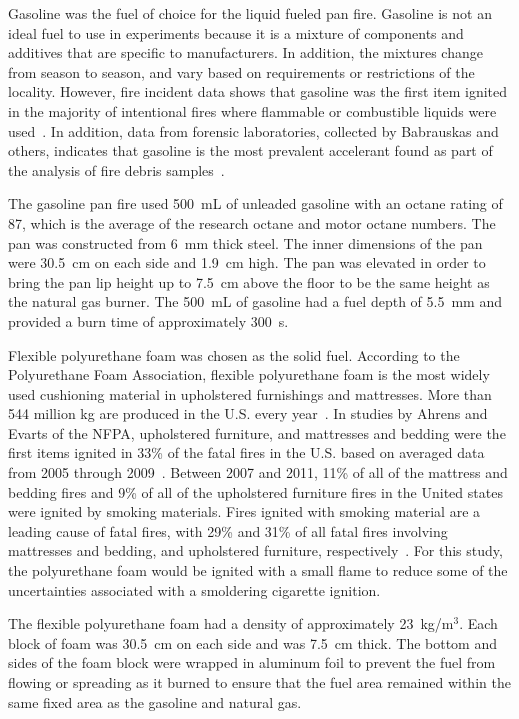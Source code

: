 \documentclass[twoside]{uocthesis}
\begin{document}
{Gasoline was the fuel of choice for the liquid fueled pan fire.  Gasoline is not an ideal fuel to use in experiments because it is a mixture of components and additives that are specific to manufacturers. In addition, the mixtures change from season to season, and vary based on requirements or restrictions of the locality.  However, fire incident data shows that gasoline was the first item ignited in the majority of intentional fires where flammable or combustible liquids were used~\cite{Rohr:2001}. In addition, data from forensic laboratories, collected by Babrauskas and others, indicates that gasoline is the most prevalent accelerant found as part of the analysis of fire debris samples~\cite{Babrauskas:2003,Chasteen:2010}.

The gasoline pan fire used 500~mL of unleaded gasoline with an octane rating of 87, which is the average of the research octane and motor octane numbers.  The pan was constructed from 6~mm thick steel.  The inner dimensions of the pan were 30.5~cm on each side and 1.9~cm high.  The pan was elevated in order to bring the pan lip height up to 7.5~cm above the floor to be the same height as the natural gas burner.  The 500~mL of gasoline had a fuel depth of 5.5~mm and provided a burn time of approximately 300~s.

Flexible polyurethane foam was chosen as the solid fuel. According to the Polyurethane Foam Association, flexible polyurethane foam is the most widely used cushioning material in upholstered furnishings and mattresses. More than 544 million kg are produced in the U.S. every year~\cite{Foam,Polyurethane_Foam}. In studies by Ahrens and Evarts of the NFPA, upholstered furniture, and mattresses and bedding were the first items ignited in 33\% of the fatal fires in the U.S. based on averaged data from 2005 through 2009~\cite{Ahrens:2011,Evarts:2011}.  Between 2007 and 2011, 11\% of all of the mattress and bedding fires and 9\% of all of the upholstered furniture fires in the United states were ignited by smoking materials.  Fires ignited with smoking material are a leading cause of fatal fires, with 29\% and 31\% of all fatal fires involving mattresses and bedding, and upholstered furniture, respectively~\cite{Hall:2013}.  For this study, the polyurethane foam would be ignited with a small flame to reduce some of the uncertainties associated with a smoldering cigarette ignition.    

The flexible polyurethane foam had a density of approximately 23~kg/m$^3$.  Each block of foam was 30.5~cm on each side and was 7.5~cm thick. The bottom and sides of the foam block were wrapped in aluminum foil to prevent the fuel from flowing or spreading as it burned to ensure that the fuel area remained within the same fixed area as the gasoline and natural gas.

}
\end{document}

